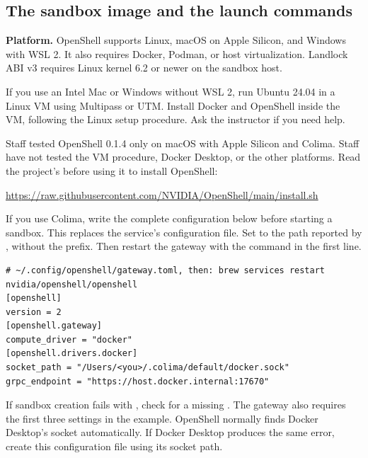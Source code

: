 \documentclass[9pt,letterpaper]{article}
\begin{document}
\subsection{The sandbox image and the launch commands}\label{sec:sandbox}

\textbf{Platform.} OpenShell supports Linux, macOS on Apple Silicon, and Windows
with WSL 2. It also requires Docker, Podman, or host virtualization. Landlock ABI
v3 requires Linux kernel 6.2 or newer on the sandbox host.

If you use an Intel Mac or Windows without WSL 2, run Ubuntu 24.04 in a Linux VM
using Multipass or UTM. Install Docker and OpenShell inside the VM, following
the Linux setup procedure. Ask the instructor if you need help.

Staff tested OpenShell 0.1.4 only on macOS with Apple Silicon and Colima. Staff
have not tested the VM procedure, Docker Desktop, or the other platforms.
Read the project's  before using it to install OpenShell:
\par\noindent\url{https://raw.githubusercontent.com/NVIDIA/OpenShell/main/install.sh}\par
If you use Colima, write the complete configuration below before starting a
sandbox. This replaces the service's configuration file. Set 
to the path reported by , without the
 prefix. Then restart the gateway with the command in the first
line.
\begin{verbatim}
# ~/.config/openshell/gateway.toml, then: brew services restart nvidia/openshell/openshell
[openshell]
version = 2
[openshell.gateway]
compute_driver = "docker"
[openshell.drivers.docker]
socket_path = "/Users/<you>/.colima/default/docker.sock"
grpc_endpoint = "https://host.docker.internal:17670"
\end{verbatim}
If sandbox creation fails with , check for a
missing . The gateway also requires the first three settings
in the example. OpenShell normally finds Docker Desktop's socket automatically.
If Docker Desktop produces the same error, create this configuration file using
its socket path.
\end{document}
